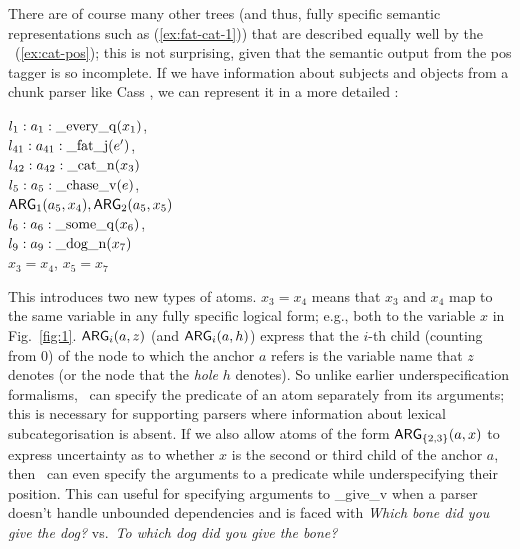 
There are of course many other trees (and thus, fully specific
semantic representations such as (\ref{ex:fat-cat-1})) that are
described equally well by the \rmrs\ (\ref{ex:cat-pos}); this is not
surprising, given that the semantic output from the {\sc
  pos} tagger is so incomplete.  If we have
information about subjects and objects from a chunk parser
like Cass \cite{abney:1996}, we can represent it in a more detailed
\rmrs:

\begin{examples}
\item 
$l_1:a_1:\mathrm{\_every\_q}(x_1)$, \\
$l_{41}:a_{41}:\mathrm{\_fat\_j}(e')$,\\
$l_{42}:a_{42}:\mathrm{\_cat\_n}(x_3)$\\
$l_5:a_5:\mathrm{\_chase\_v}(e)$, \\
\hspace*{0.1in} $\mathsf{ARG}_1(a_5,x_4),
\mathsf{ARG}_2(a_5,x_5)$\\ 
$l_6:a_6:\mathrm{\_some\_q}(x_6)$, \\
$l_9:a_9:\mathrm{\_dog\_n}(x_7)$\\
$x_3=x_4$, $x_5=x_7$
\label{ex:cat-partial-parser}
\end{examples}

This introduces two new types of atoms.   $x_3=x_4$
means that $x_3$ and $x_4$ map to the same
variable in any fully specific logical form; e.g., both to the
variable $x$ in Fig.~\ref{fig:1}.   $\mathsf{ARG}_i(a,z)$ (and
$\mathsf{ARG}_i(a,h)$) express that the $i$-th child (counting from 0) of the
node to which the anchor $a$ refers is the variable name that $z$
denotes (or the node that the {\em hole} $h$ denotes).  So unlike
earlier underspecification formalisms, \rmrs\ can specify the
predicate of an atom separately from its
arguments; this is necessary for supporting parsers where information
about lexical subcategorisation is absent. If we also allow atoms of
the form $\mathsf{ARG}_{\{2,3\}}(a,x)$ to express uncertainty as to whether
$x$ is the second or third child of the anchor $a$, then \rmrs\ can
even specify the arguments to a predicate while underspecifying their
position.  This can useful for specifying arguments to \_give\_v when a
parser doesn't handle unbounded dependencies and is faced with
{\em Which bone did you give the dog?} vs.\ {\em To which dog did you
  give the bone?}

